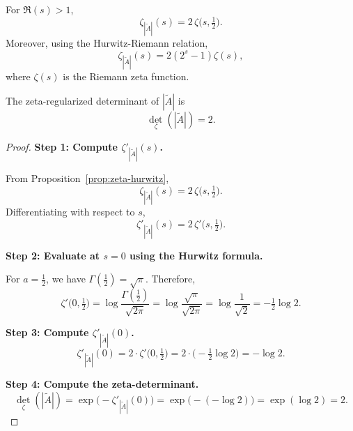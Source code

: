 \documentclass[10pt,a4paper]{amsart}
\begin{document}
\begin{proposition}
\label{prop:zeta-hurwitz}
For $\Re(s) > 1$,
\[
\zeta_{|\widetilde{A}|}(s) = 2 \, \zeta\bigl(s, \tfrac{1}{2}\bigr).
\]
Moreover, using the Hurwitz-Riemann relation,
\[
\zeta_{|\widetilde{A}|}(s) = 2(2^s - 1) \zeta(s),
\]
where $\zeta(s)$ is the Riemann zeta function.
\end{proposition}

\begin{theorem}
\label{thm:zeta-det}
The zeta-regularized determinant of $|\widetilde{A}|$ is
\[
\det_{\zeta}(|\widetilde{A}|) = 2.
\]
\end{theorem}

\begin{proof}
\textbf{Step 1: Compute $\zeta'_{|\widetilde{A}|}(s)$.}

From Proposition~\ref{prop:zeta-hurwitz},
\[
\zeta_{|\widetilde{A}|}(s) = 2 \, \zeta\bigl(s, \tfrac{1}{2}\bigr).
\]
Differentiating with respect to $s$,
\[
\zeta'_{|\widetilde{A}|}(s) = 2 \, \zeta'\bigl(s, \tfrac{1}{2}\bigr).
\]

\textbf{Step 2: Evaluate at $s=0$ using the Hurwitz formula.}

For $a = \tfrac{1}{2}$, we have $\Gamma(\tfrac{1}{2}) = \sqrt{\pi}$. Therefore,
\[
\zeta'\bigl(0, \tfrac{1}{2}\bigr) = \log \frac{\Gamma(\tfrac{1}{2})}{\sqrt{2\pi}} = \log \frac{\sqrt{\pi}}{\sqrt{2\pi}} = \log \frac{1}{\sqrt{2}} = -\tfrac{1}{2} \log 2.
\]

\textbf{Step 3: Compute $\zeta'_{|\widetilde{A}|}(0)$.}
\[
\zeta'_{|\widetilde{A}|}(0) = 2 \cdot \zeta'\bigl(0, \tfrac{1}{2}\bigr) = 2 \cdot \bigl(-\tfrac{1}{2} \log 2\bigr) = -\log 2.
\]

\textbf{Step 4: Compute the zeta-determinant.}
\[
\det_{\zeta}(|\widetilde{A}|) = \exp\bigl(-\zeta'_{|\widetilde{A}|}(0)\bigr) = \exp\bigl(-(-\log 2)\bigr) = \exp(\log 2) = 2.
\]
\end{proof}
\end{document}
